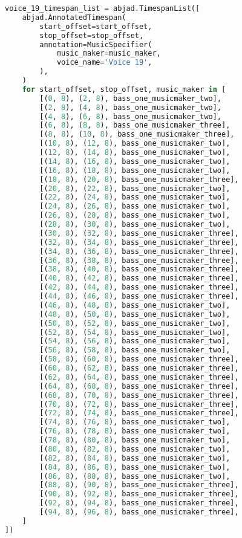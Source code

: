 \begin{lstlisting}[language=Python, caption=Invocation Source Code]
voice_19_timespan_list = abjad.TimespanList([
    abjad.AnnotatedTimespan(
        start_offset=start_offset,
        stop_offset=stop_offset,
        annotation=MusicSpecifier(
            music_maker=music_maker,
            voice_name='Voice 19',
        ),
    )
    for start_offset, stop_offset, music_maker in [
        [(0, 8), (2, 8), bass_one_musicmaker_two],
        [(2, 8), (4, 8), bass_one_musicmaker_two],
        [(4, 8), (6, 8), bass_one_musicmaker_two],
        [(6, 8), (8, 8), bass_one_musicmaker_three],
        [(8, 8), (10, 8), bass_one_musicmaker_three],
        [(10, 8), (12, 8), bass_one_musicmaker_two],
        [(12, 8), (14, 8), bass_one_musicmaker_two],
        [(14, 8), (16, 8), bass_one_musicmaker_two],
        [(16, 8), (18, 8), bass_one_musicmaker_two],
        [(18, 8), (20, 8), bass_one_musicmaker_three],
        [(20, 8), (22, 8), bass_one_musicmaker_two],
        [(22, 8), (24, 8), bass_one_musicmaker_two],
        [(24, 8), (26, 8), bass_one_musicmaker_two],
        [(26, 8), (28, 8), bass_one_musicmaker_two],
        [(28, 8), (30, 8), bass_one_musicmaker_two],
        [(30, 8), (32, 8), bass_one_musicmaker_three],
        [(32, 8), (34, 8), bass_one_musicmaker_three],
        [(34, 8), (36, 8), bass_one_musicmaker_three],
        [(36, 8), (38, 8), bass_one_musicmaker_three],
        [(38, 8), (40, 8), bass_one_musicmaker_three],
        [(40, 8), (42, 8), bass_one_musicmaker_three],
        [(42, 8), (44, 8), bass_one_musicmaker_three],
        [(44, 8), (46, 8), bass_one_musicmaker_three],
        [(46, 8), (48, 8), bass_one_musicmaker_two],
        [(48, 8), (50, 8), bass_one_musicmaker_two],
        [(50, 8), (52, 8), bass_one_musicmaker_two],
        [(52, 8), (54, 8), bass_one_musicmaker_two],
        [(54, 8), (56, 8), bass_one_musicmaker_two],
        [(56, 8), (58, 8), bass_one_musicmaker_two],
        [(58, 8), (60, 8), bass_one_musicmaker_three],
        [(60, 8), (62, 8), bass_one_musicmaker_three],
        [(62, 8), (64, 8), bass_one_musicmaker_three],
        [(64, 8), (68, 8), bass_one_musicmaker_three],
        [(68, 8), (70, 8), bass_one_musicmaker_three],
        [(70, 8), (72, 8), bass_one_musicmaker_three],
        [(72, 8), (74, 8), bass_one_musicmaker_three],
        [(74, 8), (76, 8), bass_one_musicmaker_two],
        [(76, 8), (78, 8), bass_one_musicmaker_two],
        [(78, 8), (80, 8), bass_one_musicmaker_two],
        [(80, 8), (82, 8), bass_one_musicmaker_two],
        [(82, 8), (84, 8), bass_one_musicmaker_two],
        [(84, 8), (86, 8), bass_one_musicmaker_two],
        [(86, 8), (88, 8), bass_one_musicmaker_two],
        [(88, 8), (90, 8), bass_one_musicmaker_three],
        [(90, 8), (92, 8), bass_one_musicmaker_three],
        [(92, 8), (94, 8), bass_one_musicmaker_three],
        [(94, 8), (96, 8), bass_one_musicmaker_three],
    ]
])


\end{lstlisting}

